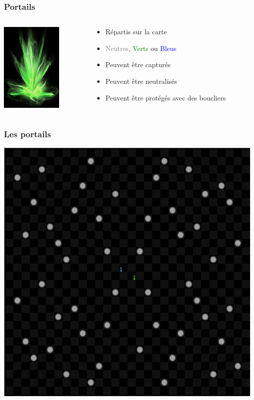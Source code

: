 \documentclass{beamer}
\begin{document}
\begin{frame}
	\frametitle{Portails}
    \begin{columns}[T]
        \begin{column}{.3\textwidth}
            \includegraphics[width=3cm]{portal}
        \end{column}
        \begin{column}{.7\textwidth}
            \begin{itemize}
                \item Répartis sur la carte
                \item \textcolor{gray}{Neutres}, \textcolor{green}{Verts} ou \textcolor{blue}{Bleus}
                \item Peuvent être capturés
                \item Peuvent être neutralisés
                \item Peuvent être protégés avec des boucliers
            \end{itemize}
        \end{column}
    \end{columns}
\end{frame}

\begin{frame}
    \begin{center}
        \frametitle{Les portails}
        \includegraphics[height=0.8\textheight]{gui_empty}
    \end{center}
\end{frame}
\end{document}

